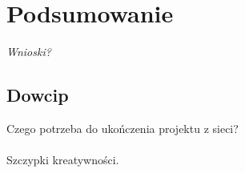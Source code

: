 \section{Podsumowanie}

\begin{center}
\textit{Wnioski?}
\end{center}

\subsection{Dowcip}
Czego potrzeba do ukończenia projektu z sieci?\\
\\
Szczypki kreatywności.